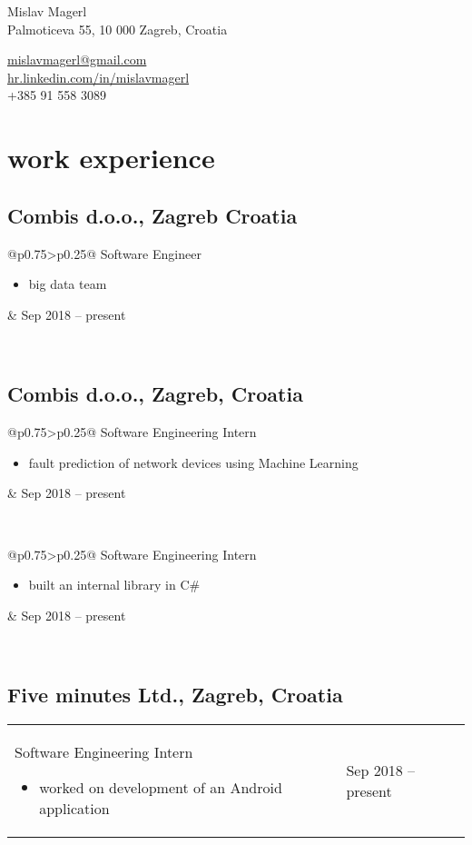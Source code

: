 \documentclass[a4paper]{article}
\makeatletter
\newlength{\tablewidth}
\newenvironment{period}[2]{%
\newcommand{\sarma}{#2}%
\setlength{\tablewidth}{\linewidth}
\addtolength{\tablewidth}{-2\tabcolsep}
\begin{tabular}{@{}p{0.75\tablewidth}>{\raggedleft\arraybackslash}p{0.25\tablewidth}@{}}%
#1 \newline
\begin{itemize}
}{%
\end{itemize} & \sarma \\%
\end{tabular}\\
}
\makeatother
\begin{document}
\fontfamily{\sfdefault}
\selectfont

\begin{minipage}{.5\textwidth}
\LARGE{Mislav Magerl}\\
\normalsize{Palmoticeva 55, 10 000 Zagreb, Croatia}
\end{minipage}%
\begin{minipage}{.5\textwidth}
\raggedleft
\href{mailto:mislavmagerl@gmail.com}{mislavmagerl@gmail.com} \\
\href{https://hr.linkedin.com/in/mislavmagerl}{hr.linkedin.com/in/mislavmagerl} \\
+385 91 558 3089
\end{minipage}

\vspace{1em}

\section{work experience}
\subsection{Combis d.o.o., Zagreb Croatia}
\begin{period}{Software Engineer}{Sep 2018 -- present}
	\item
		big data team
\end{period}

\subsection{Combis d.o.o., Zagreb, Croatia}
\begin{period}{Software Engineering Intern}{Jul 2016 -- Oct 2016}
    \item 
        fault prediction of network devices using Machine Learning
\end{period}
\begin{period}{Software Engineering Intern}{Jan 2016 -- Feb 2016}
    \item 
        built an internal library in C\#
\end{period}
\subsection{Five minutes Ltd., Zagreb, Croatia}
\begin{period}{Software Engineering Intern}{Jul 2015 -- Aug 2015}
    \item 
        worked on development of an Android application
\end{period}
\end{document}
